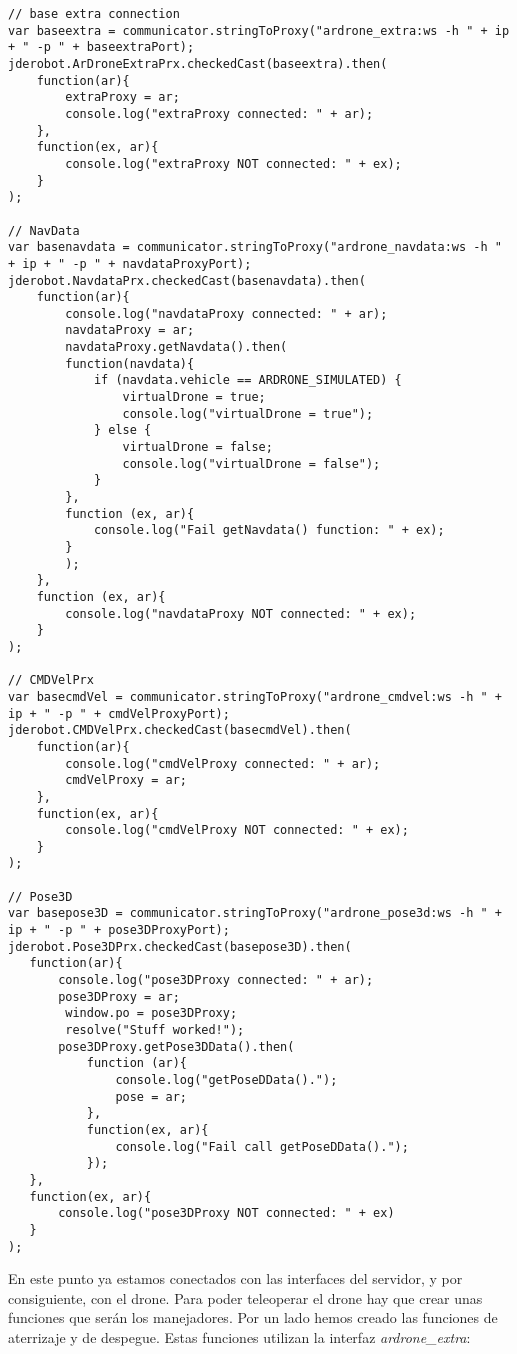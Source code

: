 \begin{lstlisting}[caption=Núcleo ArDrone]
// base extra connection
var baseextra = communicator.stringToProxy("ardrone_extra:ws -h " + ip + " -p " + baseextraPort);
jderobot.ArDroneExtraPrx.checkedCast(baseextra).then(
    function(ar){
        extraProxy = ar;
        console.log("extraProxy connected: " + ar);
    },
    function(ex, ar){
        console.log("extraProxy NOT connected: " + ex);
    }
);               

// NavData
var basenavdata = communicator.stringToProxy("ardrone_navdata:ws -h " + ip + " -p " + navdataProxyPort);
jderobot.NavdataPrx.checkedCast(basenavdata).then(
    function(ar){
        console.log("navdataProxy connected: " + ar);
        navdataProxy = ar;
        navdataProxy.getNavdata().then(
        function(navdata){
            if (navdata.vehicle == ARDRONE_SIMULATED) {
                virtualDrone = true;
                console.log("virtualDrone = true");
            } else {
                virtualDrone = false;
                console.log("virtualDrone = false");
            }
        },
        function (ex, ar){
            console.log("Fail getNavdata() function: " + ex);
        }
        );
    },
    function (ex, ar){
        console.log("navdataProxy NOT connected: " + ex);
    }        
);        

// CMDVelPrx
var basecmdVel = communicator.stringToProxy("ardrone_cmdvel:ws -h " + ip + " -p " + cmdVelProxyPort);
jderobot.CMDVelPrx.checkedCast(basecmdVel).then(
    function(ar){
        console.log("cmdVelProxy connected: " + ar);
        cmdVelProxy = ar;
    },
    function(ex, ar){
        console.log("cmdVelProxy NOT connected: " + ex);
    }
);             

// Pose3D
var basepose3D = communicator.stringToProxy("ardrone_pose3d:ws -h " + ip + " -p " + pose3DProxyPort);
jderobot.Pose3DPrx.checkedCast(basepose3D).then(
   function(ar){
       console.log("pose3DProxy connected: " + ar);
       pose3DProxy = ar;
        window.po = pose3DProxy;
        resolve("Stuff worked!");
       pose3DProxy.getPose3DData().then(
           function (ar){
               console.log("getPoseDData().");
               pose = ar;
           },
           function(ex, ar){
               console.log("Fail call getPoseDData().");
           });
   },
   function(ex, ar){
       console.log("pose3DProxy NOT connected: " + ex)
   }
);
\end{lstlisting}

En este punto ya estamos conectados con las interfaces del servidor, y por consiguiente, con el drone. Para poder teleoperar el drone hay que crear unas funciones que serán los manejadores. Por un lado hemos creado las funciones de aterrizaje y de despegue. Estas funciones utilizan la interfaz \emph{ardrone\_extra}:\\

